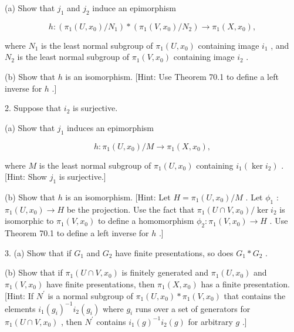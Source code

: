 \documentclass[10pt]{article}
\begin{document}
(a) Show that \({j}_{1}\) and \({j}_{2}\) induce an epimorphism

\[
h : \left( {{\pi }_{1}\left( {U,{x}_{0}}\right) /{N}_{1}}\right)  * \left( {{\pi }_{1}\left( {V,{x}_{0}}\right) /{N}_{2}}\right)  \rightarrow  {\pi }_{1}\left( {X,{x}_{0}}\right) ,
\]

where \({N}_{1}\) is the least normal subgroup of \({\pi }_{1}\left( {U,{x}_{0}}\right)\) containing image \({i}_{1}\) , and \({N}_{2}\) is the least normal subgroup of \({\pi }_{1}\left( {V,{x}_{0}}\right)\) containing image \({i}_{2}\) .

(b) Show that \(h\) is an isomorphism. [Hint: Use Theorem 70.1 to define a left inverse for \(h\) .]

2. Suppose that \({i}_{2}\) is surjective.

(a) Show that \({j}_{1}\) induces an epimorphism

\[
h : {\pi }_{1}\left( {U,{x}_{0}}\right) /M \rightarrow  {\pi }_{1}\left( {X,{x}_{0}}\right) ,
\]

where \(M\) is the least normal subgroup of \({\pi }_{1}\left( {U,{x}_{0}}\right)\) containing \({i}_{1}\left( {\ker {i}_{2}}\right)\) . [Hint: Show \({j}_{1}\) is surjective.]

(b) Show that \(h\) is an isomorphism. [Hint: Let \(H = {\pi }_{1}\left( {U,{x}_{0}}\right) /M\) . Let \({\phi }_{1}\) : \({\pi }_{1}\left( {U,{x}_{0}}\right)  \rightarrow  H\) be the projection. Use the fact that \({\pi }_{1}\left( {U \cap  V,{x}_{0}}\right) /\ker {i}_{2}\) is isomorphic to \({\pi }_{1}\left( {V,{x}_{0}}\right)\) to define a homomorphism \({\phi }_{2} : {\pi }_{1}\left( {V,{x}_{0}}\right)  \rightarrow  H\) . Use Theorem 70.1 to define a left inverse for \(h\) .]

3. (a) Show that if \({G}_{1}\) and \({G}_{2}\) have finite presentations, so does \({G}_{1} * {G}_{2}\) .

(b) Show that if \({\pi }_{1}\left( {U \cap  V,{x}_{0}}\right)\) is finitely generated and \({\pi }_{1}\left( {U,{x}_{0}}\right)\) and \({\pi }_{1}\left( {V,{x}_{0}}\right)\) have finite presentations, then \({\pi }_{1}\left( {X,{x}_{0}}\right)\) has a finite presentation. [Hint: If \({N}^{\prime }\) is a normal subgroup of \({\pi }_{1}\left( {U,{x}_{0}}\right)  * {\pi }_{1}\left( {V,{x}_{0}}\right)\) that contains the elements \({i}_{1}{\left( {g}_{i}\right) }^{-1}{i}_{2}\left( {g}_{i}\right)\) where \({g}_{i}\) runs over a set of generators for \({\pi }_{1}\left( {U \cap  V,{x}_{0}}\right)\) , then \({N}^{\prime }\) contains \({i}_{1}{\left( g\right) }^{-1}{i}_{2}\left( g\right)\) for arbitrary \(g\) .]
\end{document}

